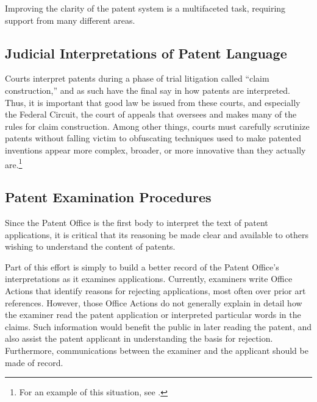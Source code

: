 \documentclass[11pt,twocolumn,titlepage]{article}
\begin{document}
Improving the clarity of the patent system is a multifaceted task, requiring
support from many different areas.

\subsection{Judicial Interpretations of Patent Language}
\SectionNote

Courts interpret patents during a
phase of trial litigation called ``claim construction,'' and as such have the
final say in how patents are interpreted. Thus, it is important that good law be
issued from these courts, and especially the Federal Circuit, the court of
appeals that oversees and makes many of the rules for claim construction.
Among other things, courts must carefully
scrutinize patents without falling victim to obfuscating techniques used to
make patented inventions appear more complex, broader, or more innovative than
they actually are.\footnote{For an example of this situation, see
.}

\subsection{Patent Examination Procedures}
\SectionNote

Since the Patent Office is the first body to
interpret the text of patent applications, it is critical that its reasoning be
made clear and available to others wishing to understand the content of
patents.

Part of this effort is simply to build a better record of the Patent Office's
interpretations as it examines applications. Currently, examiners write Office
Actions that identify reasons for rejecting applications, most often over prior
art references. However, those Office Actions do not generally explain in
detail how the examiner read the patent application or interpreted particular
words in the claims.
Such information would benefit the public in later reading
the patent, and also assist the patent applicant in understanding the basis for
rejection. Furthermore, communications between the examiner and the applicant
should be made of record.
\end{document}
